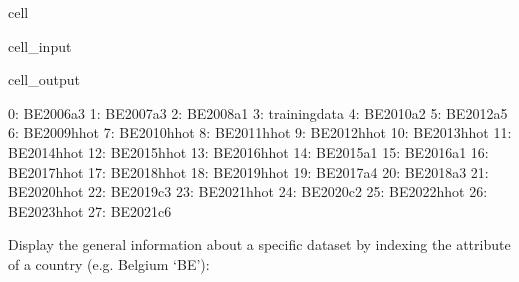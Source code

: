 \documentclass[letterpaper,10pt,english]{sphinxmanual}
\begin{document}
\begin{sphinxuseclass}{cell}
\begin{sphinxuseclass}{cell_input}
\begin{sphinxVerbatim}[commandchars=\\\{\}]
\PYG{p}{[}\PYG{p}{]}
\end{sphinxVerbatim}

\end{sphinxuseclass}
\begin{sphinxuseclass}{cell_output}
\begin{sphinxVerbatim}[commandchars=\\\{\}]
0: BE\PYGZus{}2006\PYGZus{}a3   
1: BE\PYGZus{}2007\PYGZus{}a3   
2: BE\PYGZus{}2008\PYGZus{}a1   
3: training\PYGZus{}data
4: BE\PYGZus{}2010\PYGZus{}a2   
5: BE\PYGZus{}2012\PYGZus{}a5   
6: BE\PYGZus{}2009\PYGZus{}hhot 
7: BE\PYGZus{}2010\PYGZus{}hhot 
8: BE\PYGZus{}2011\PYGZus{}hhot 
9: BE\PYGZus{}2012\PYGZus{}hhot 
10: BE\PYGZus{}2013\PYGZus{}hhot
11: BE\PYGZus{}2014\PYGZus{}hhot
12: BE\PYGZus{}2015\PYGZus{}hhot
13: BE\PYGZus{}2016\PYGZus{}hhot
14: BE\PYGZus{}2015\PYGZus{}a1  
15: BE\PYGZus{}2016\PYGZus{}a1  
16: BE\PYGZus{}2017\PYGZus{}hhot
17: BE\PYGZus{}2018\PYGZus{}hhot
18: BE\PYGZus{}2019\PYGZus{}hhot
19: BE\PYGZus{}2017\PYGZus{}a4  
20: BE\PYGZus{}2018\PYGZus{}a3  
21: BE\PYGZus{}2020\PYGZus{}hhot
22: BE\PYGZus{}2019\PYGZus{}c3  
23: BE\PYGZus{}2021\PYGZus{}hhot
24: BE\PYGZus{}2020\PYGZus{}c2  
25: BE\PYGZus{}2022\PYGZus{}hhot
26: BE\PYGZus{}2023\PYGZus{}hhot
27: BE\PYGZus{}2021\PYGZus{}c6  
\end{sphinxVerbatim}

\end{sphinxuseclass}
\end{sphinxuseclass}
\sphinxAtStartPar
Display the general information about a specific dataset by indexing the  attribute of a country (e.g. Belgium ‘BE’):
\end{document}

